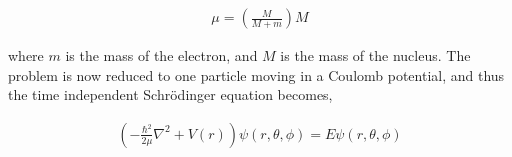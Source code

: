 \documentclass[11pt]{amsart}
\begin{document}
\begin{align*}
  \mu = \left(\frac{M}{M+m}\right) M
\end{align*}

where $m$ is the mass of the electron, and $M$ is the mass of the nucleus. The problem is now reduced to one particle moving in a Coulomb potential, and thus the time independent Schr\"{o}dinger equation becomes,

\begin{align*}
  \left(-\frac{\hbar^2}{2\mu}\nabla^2+V(r)\right)\psi(r,\theta,\phi)=E\psi(r,\theta,\phi)
\end{align*}
\end{document}
